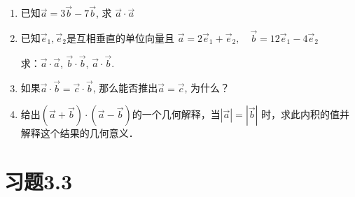 \begin{ex}
\begin{enumerate}
    \item 已知$\vec{a}=3\vec{b}-7\vec{b}$, 求
    $\vec{a}\cdot \vec{a}$
\item  已知$\vec{e}_1,\vec{e}_2$是互相垂直的单位向量且
   $ \vec{a}=2\vec{e}_1+\vec{e}_2,\quad \vec{b}=12\vec{e}_1-4\vec{e}_2$
   
   求：$\vec{a}\cdot \vec{a}$, $\vec{b}\cdot \vec{b}$, $\vec{a}\cdot \vec{b}$.

   \item 如果$\vec{a}\cdot \vec{b}=\vec{c}\cdot \vec{b}$, 那么能否推出$\vec{a}=\vec{c}$, 为什么？
    \item 给出$(\vec{a}+\vec{b})\cdot (\vec{a}-\vec{b})$的一个几何解释，当$|\vec{a}|=|\vec{b}|$
    时，求此内积的值并解释这个结果的几何意义．
\end{enumerate}
\end{ex}

\section*{习题3.3}

